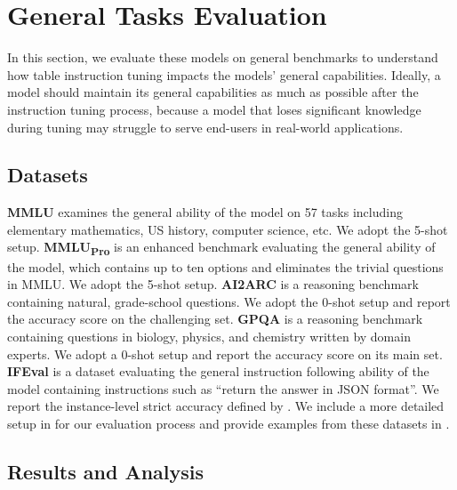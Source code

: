 \documentclass[11pt]{article}
\newcommand{\dnaihao}[1]{\textcolor{blue}{[naihao: #1]}}
\begin{document}



\section{General Tasks Evaluation}
\label{sec: general-eval}

In this section, we evaluate these models on general benchmarks to understand how table instruction tuning impacts the models' general capabilities. 
Ideally, a model should maintain its general capabilities as much as possible after the instruction tuning process, because a model that loses significant knowledge during tuning may struggle to serve end-users in real-world applications.

\subsection{Datasets}

\textbf{MMLU} \citep{hendryckstest2021} examines the general ability of the model on 57 tasks including elementary mathematics, US history, computer science, etc.
We adopt the 5-shot setup.
\textbf{MMLU\textsubscript{Pro}} \citep{wang2024mmlupro} is an enhanced benchmark evaluating the general ability of the model, which contains up to ten options and eliminates the trivial questions in MMLU.
We adopt the 5-shot setup.
\textbf{AI2ARC} \citep{clark2018think} is a reasoning benchmark containing natural, grade-school questions. 
We adopt the 0-shot setup and report the accuracy score on the challenging set.
\textbf{GPQA} \citep{rein2023gpqa} is a reasoning benchmark containing questions in biology, physics, and chemistry written by domain experts. 
We adopt a 0-shot setup and report the accuracy score on its main set.
\textbf{IFEval} \citep{zhou2023instruction} is a dataset evaluating the general instruction following ability of the model containing instructions such as ``return the answer in JSON format''.
We report the instance-level strict accuracy defined by \citet{zhou2023instruction}.
We include a more detailed setup in  for our evaluation process and provide examples from these datasets in .

\subsection{Results and Analysis}
\end{document}
